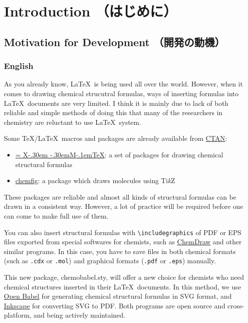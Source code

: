 \documentclass[12pt]{jsarticle}
\def\XyM{\ifnum\fam=-1\relax\fam=0\relax\fi\TestCount=\fam%
X\kern-.30em\smash{\raise.50ex\hbox{$\fam\TestCount\Upsilon$}}%
\kern-.30em{M}}
\def\XyMTeX{\XyM\kern-.1em\TeX}
\begin{document}
\clearpage
\setcounter{tocdepth}{3}
\tableofcontents

\clearpage
{}

\section{Introduction （はじめに）}

\subsection{Motivation for Development （開発の動機）}

\subsubsection{English}

As you already know, \LaTeX\ is being used all over the world.
However, when it comes to drawing chemical strucutral formulas, ways of inserting formulas into \LaTeX\ documents are very limited.
I think it is mainly due to lack of both reliable and simple methods of doing this that many of the researchers in chemistry are reluctant to use \LaTeX\ system.

Some \TeX/\LaTeX\ macros and packages are already available from \href{http://www.ctan.org/}{CTAN}:
\begin{itemize}
\item \href{http://www.ctan.org/pkg/xymtex}{\XyMTeX}: a set of packages for drawing chemical structural formulas
\item \href{http://www.ctan.org/pkg/chemfig}{\textsf{chemfig}}: a package which draws molecules using Ti\textit{k}Z
\end{itemize}
These packages are reliable and almost all kinds of structural formulas can be drawn in a consistent way.
However, a lot of practice will be required before one can come to make full use of them.

You can also insert structural formulas with \verb|\includegraphics| of PDF or EPS files exported from special softwares for chemists, such as \href{http://www.cambridgesoft.com/Ensemble_for_Chemistry/ChemDraw/}{ChemDraw} and other similar programs.
In this case, you have to save files in both chemical formats (such as \verb|.cdx| or \verb|.mol|) and graphical formats (\verb|.pdf| or \verb|.eps|) manually.

This new package, \textsf{chemobabel.sty}, will offer a new choice for chemists who need chemical structures inserted in their \LaTeX\ documents.
In this method, we use \href{http://openbabel.org/}{Open Babel} for generating chemical structural formulas in SVG format, and \href{https://inkscape.org/en/}{Inkscape} for converting SVG to PDF.
Both programs are open source and cross-platform, and being actively maintained. \\
\end{document}
